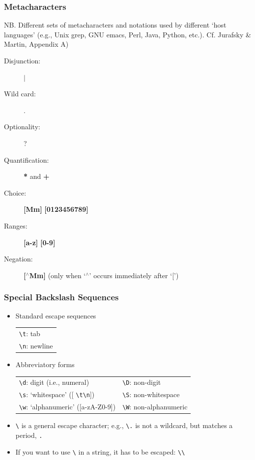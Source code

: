 \begin{frame}[fragile]
  \frametitle{Metacharacters}

NB. Different sets of metacharacters and notations used by different `host languages' (e.g., Unix
grep, GNU emacs, Perl, Java, Python,  etc.). Cf. Jurafsky \& Martin, Appendix A)

\begin{description}
  \item [Disjunction:] \textbf{$\mid$}
  \item [Wild card:] \textbf{}.
  \item [Optionality:] \textbf{}?
  \item [Quantification:] \textbf{*} and \textbf{+}
  \item [Choice:] \textbf{[Mm]} \textbf{[0123456789]}
  \item [Ranges:] \textbf{[a-z]} \textbf{[0-9]}
  \item [Negation:] \textbf{[$^\wedge$Mm]} (only when `$^\wedge$' occurs immediately
    after `[')

\end{description}
\end{frame}
\begin{frame}[fragile]
  \frametitle{Special Backslash Sequences}

  \begin{itemize}
  \item Standard escape sequences\\
  \begin{tabular}{l}
\verb!\t!: tab \\
\verb!\n!: newline \\
  \end{tabular}

  \item Abbreviatory forms\\
  \begin{tabular}{ll}
\verb!\d!: digit (i.e., numeral) & \verb!\D!: non-digit \\
\verb!\s!: `whitespace' ([ \verb!\t\n!]) & \verb!\S!: non-whitespace \\
\verb!\w!: `alphanumeric' ([a-zA-Z0-9]) & \verb!\W!: non-alphanumeric \\
  \end{tabular}

   \item \verb!\! is a general escape character; e.g., \verb!\.! is
         not a wildcard, but
         matches a period, \verb!.!
   \item If you want to use \verb!\! in a string, it has to be
         escaped: \verb!\\!

  \end{itemize}





\end{frame}

